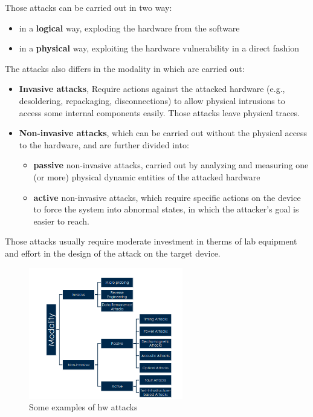 Those attacks can be carried out in two way:
\begin{itemize}
  \item in a \textbf{logical} way, exploding the hardware from the software
  \item in a \textbf{physical} way, exploiting the hardware vulnerability in a direct fashion
\end{itemize}

The attacks also differs in the modality in which are carried out:
\begin{itemize}
  \item \textbf{Invasive attacks}, Require actions against the attacked hardware (e.g., desoldering,
    repackaging, disconnections) to allow physical intrusions to access some internal components
    easily. Those attacks leave physical traces.
  \item \textbf{Non-invasive attacks}, which can be carried out without the physical access to the
    hardware, and are further divided into:
    \begin{itemize}
      \item \textbf{passive} non-invasive attacks, carried out by analyzing and measuring one (or
        more) physical dynamic entities of the attacked hardware
      \item \textbf{active} non-invasive attacks, which require specific actions on the device to
        force the system into abnormal states, in which the attacker’s goal is easier to reach.
    \end{itemize}
\end{itemize}
Those attacks usually require moderate investment in therms of lab equipment and effort in the
design of the attack on the target device.
\begin{figure}[H]
  \centering
  \includegraphics[width=0.6\textwidth]{img/hardware/hw attacks modalities.png}
  \caption{Some examples of hw attacks}
  \label{fig:hw-attacks-modality}
\end{figure}
